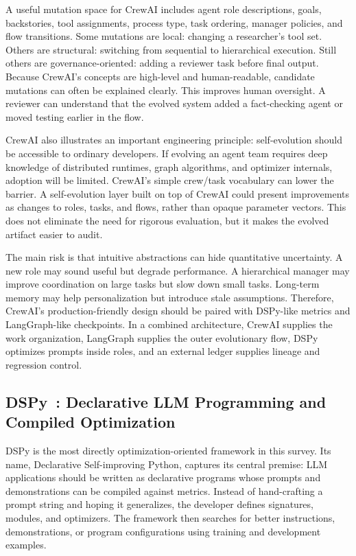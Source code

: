 A useful mutation space for CrewAI includes agent role descriptions, goals, backstories, tool assignments, process type, task ordering, manager policies, and flow transitions.  Some mutations are local: changing a researcher's tool set.  Others are structural: switching from sequential to hierarchical execution.  Still others are governance-oriented: adding a reviewer task before final output.  Because CrewAI's concepts are high-level and human-readable, candidate mutations can often be explained clearly.  This improves human oversight.  A reviewer can understand that the evolved system added a fact-checking agent or moved testing earlier in the flow.

CrewAI also illustrates an important engineering principle: self-evolution should be accessible to ordinary developers.  If evolving an agent team requires deep knowledge of distributed runtimes, graph algorithms, and optimizer internals, adoption will be limited.  CrewAI's simple crew/task vocabulary can lower the barrier.  A self-evolution layer built on top of CrewAI could present improvements as changes to roles, tasks, and flows, rather than opaque parameter vectors.  This does not eliminate the need for rigorous evaluation, but it makes the evolved artifact easier to audit.

The main risk is that intuitive abstractions can hide quantitative uncertainty.  A new role may sound useful but degrade performance.  A hierarchical manager may improve coordination on large tasks but slow down small tasks.  Long-term memory may help personalization but introduce stale assumptions.  Therefore, CrewAI's production-friendly design should be paired with DSPy-like metrics and LangGraph-like checkpoints.  In a combined architecture, CrewAI supplies the work organization, LangGraph supplies the outer evolutionary flow, DSPy optimizes prompts inside roles, and an external ledger supplies lineage and regression control.

\subsection{DSPy~\cite{dspy2023}: Declarative LLM Programming and Compiled Optimization}
\label{subsec:dspy}

DSPy is the most directly optimization-oriented framework in this survey.  Its name, Declarative Self-improving Python, captures its central premise: LLM applications should be written as declarative programs whose prompts and demonstrations can be compiled against metrics.  Instead of hand-crafting a prompt string and hoping it generalizes, the developer defines signatures, modules, and optimizers.  The framework then searches for better instructions, demonstrations, or program configurations using training and development examples.

